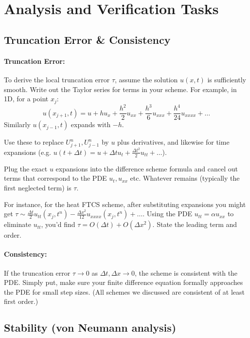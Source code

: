 \documentclass[a4paper,11pt]{report}
\begin{document}
\section{Analysis and Verification Tasks}

\subsection{Truncation Error \& Consistency}

\paragraph{Truncation Error:}
To derive the local truncation error $\tau$, assume the solution $u(x,t)$ is sufficiently smooth. Write out the Taylor series for terms in your scheme. For example, in 1D, for a point $x_j$:
$$u(x_{j+1}, t) = u + h u_x + \frac{h^2}{2}u_{xx} + \frac{h^3}{6}u_{xxx} + \frac{h^4}{24} u_{xxxx} + \ldots$$
Similarly $u(x_{j-1},t)$ expands with $-h$.

Use these to replace $U_{j+1}^n, U_{j-1}^n$ by $u$ plus derivatives, and likewise for time expansions (e.g. $u(t+\Delta t) = u + \Delta tu_t + \frac{\Delta t^2}{2}u_{tt} + \ldots$).

Plug the exact $u$ expansions into the difference scheme formula and cancel out terms that correspond to the PDE $u_{t}, u_{xx}$ etc. Whatever remains (typically the first neglected term) is $\tau$.

For instance, for the heat FTCS scheme, after substituting expansions you might get $\tau \sim \frac{\Delta t}{2}u_{tt}(x_j,t^n) - \frac{\Delta x^2}{12}u_{xxxx}(x_j,t^n) + \ldots$. Using the PDE $u_{tt} = \alpha u_{xx}$ to eliminate $u_{tt}$, you'd find $\tau = O(\Delta t) + O(\Delta x^2)$. State the leading term and order.

\paragraph{Consistency:} If the truncation error $\tau \to 0$ as $\Delta t, \Delta x \to 0$, the scheme is consistent with the PDE. Simply put, make sure your finite difference equation formally approaches the PDE for small step sizes. (All schemes we discussed are consistent of at least first order.)

\subsection{Stability (von Neumann analysis)}
\end{document}

